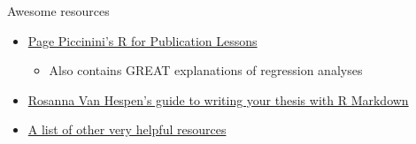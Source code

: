 \documentclass[
  ignorenonframetext,
]{beamer}
\providecommand{\tightlist}{%
  \setlength{\itemsep}{0pt}\setlength{\parskip}{0pt}}
\begin{document}
\begin{frame}{Awesome resources}
\protect\hypertarget{awesome-resources}{}

\begin{itemize}
\item
  \href{https://datascienceplus.com/r-for-publication-by-page-piccinini-lesson-1-r-basics/}{Page
  Piccinini's R for Publication Lessons}

  \begin{itemize}
  \tightlist
  \item
    Also contains GREAT explanations of regression analyses
  \end{itemize}
\item
  \href{https://rosannavanhespenresearch.wordpress.com/2016/02/03/writing-your-thesis-with-r-markdown-1-getting-started/}{Rosanna
  Van Hespen's guide to writing your thesis with R Markdown}
\item
  \href{https://www.one-tab.com/page/d00HO6mxTTuqo2o7aGCffQ}{A list of
  other very helpful resources}
\end{itemize}

\end{frame}
\end{document}
